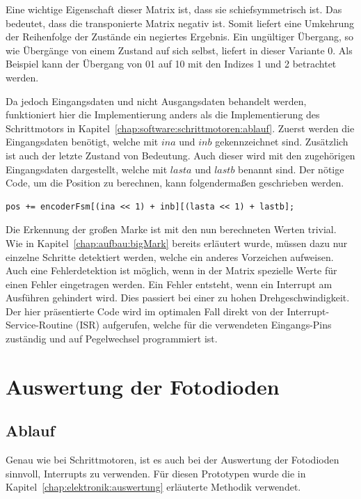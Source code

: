 Eine wichtige Eigenschaft dieser Matrix ist, dass sie schiefsymmetrisch ist.
Das bedeutet, dass die transponierte Matrix negativ ist.
Somit liefert eine Umkehrung der Reihenfolge der Zustände ein negiertes Ergebnis.
Ein ungültiger Übergang, so wie Übergänge von einem Zustand auf sich selbst, liefert in dieser Variante 0.
Als Beispiel kann der Übergang von 01 auf 10 mit den Indizes 1 und 2 betrachtet werden.

Da jedoch Eingangsdaten und nicht Ausgangsdaten behandelt werden, funktioniert hier die Implementierung anders als die Implementierung des Schrittmotors in Kapitel~\ref{chap:software:schrittmotoren:ablauf}.
Zuerst werden die Eingangsdaten benötigt, welche mit $ina$ und $inb$ gekennzeichnet sind.
Zusätzlich ist auch der letzte Zustand von Bedeutung.
Auch dieser wird mit den zugehörigen Eingangsdaten dargestellt, welche mit $lasta$ und $lastb$ benannt sind.
Der nötige Code, um die Position zu berechnen, kann folgendermaßen geschrieben werden.

\begin{minipage}{\textwidth}
\begin{lstlisting}
pos += encoderFsm[(ina << 1) + inb][(lasta << 1) + lastb];
\end{lstlisting}
\end{minipage}

Die Erkennung der großen Marke ist mit den nun berechneten Werten trivial.
Wie in Kapitel~\ref{chap:aufbau:bigMark} bereits erläutert wurde, müssen dazu nur einzelne Schritte detektiert werden, welche ein anderes Vorzeichen aufweisen.
Auch eine Fehlerdetektion ist möglich, wenn in der Matrix spezielle Werte für einen Fehler eingetragen werden.
Ein Fehler entsteht, wenn ein Interrupt am Ausführen gehindert wird.
Dies passiert bei einer zu hohen Drehgeschwindigkeit.
Der hier präsentierte Code wird im optimalen Fall direkt von der Interrupt-Service-Routine (ISR) aufgerufen, welche für die verwendeten Eingangs-Pins zuständig und auf Pegelwechsel programmiert ist.


\section{Auswertung der Fotodioden}

\subsection{Ablauf}

Genau wie bei Schrittmotoren, ist es auch bei der Auswertung der Fotodioden sinnvoll, Interrupts zu verwenden.
Für diesen Prototypen wurde die in Kapitel~\ref{chap:elektronik:auswertung} erläuterte Methodik verwendet.

